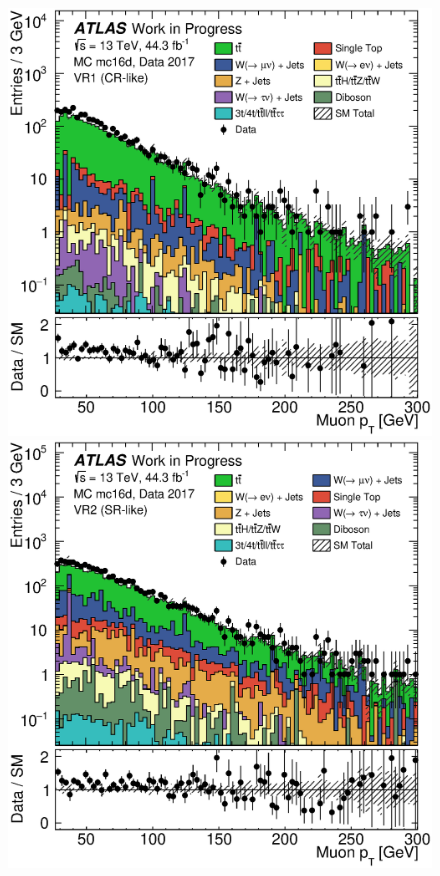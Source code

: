 \begin{figure}[th!]
    \includegraphics[width=\individualPlotWidth]{Assets/Plots/VR1/h_stack_mc16d_data17_mu_pt.eps}
    \hspace{1em}
    \includegraphics[width=\individualPlotWidth]{Assets/Plots/VR2/h_stack_mc16d_data17_mu_pt.eps}


\end{figure}
